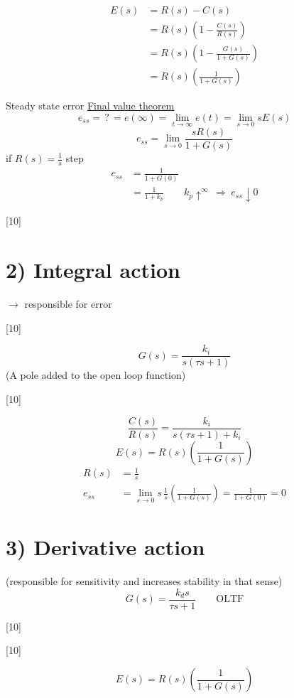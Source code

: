 \documentclass[11pt,a4paper]{article}
\begin{document}
\begin{align*}
E(s)&=R(s)-C(s)\\
&=R(s)\left(1-\frac{C(s)}{R(s)}\right)\\
&=R(s)\left(1-\frac{G(s)}{1+G(s)}\right)\\
&=R(s)\left(\frac{1}{1+G(s)}\right)
\end{align*}

Steady state error \hfill \underline{Final value theorem}
\[
e_{ss}=\,?\,=e(\infty)=\lim_{t\to\infty}e(t)=\lim_{s\to 0}sE(s)
\]
\[
e_{ss}=\lim_{s\to 0}\frac{sR(s)}{1+G(s)}
\]
if $R(s)=\frac{1}{s}$ step
\begin{align*}
e_{ss}&=\frac{1}{1+G(0)}\\
&=\frac{1}{1+k_p}\qquad k_p\uparrow^{\infty}\ \Rightarrow\ e_{ss}\downarrow 0
\end{align*}

[10]

\section{2) Integral action}
$\rightarrow$ responsible for error

[10]

\[
G(s)=\frac{k_i}{s(\tau s+1)}
\]
(A pole added to the open loop function)

[10]

\[
\frac{C(s)}{R(s)}=\frac{k_i}{s(\tau s+1)+k_i}
\]
\[
E(s)=R(s)\left(\frac{1}{1+G(s)}\right)
\]
\begin{align*}
R(s)&=\frac{1}{s}\\
e_{ss}&=\lim_{s\to 0}s\,\frac{1}{s}\left(\frac{1}{1+G(s)}\right)=\frac{1}{1+G(0)}=0
\end{align*}

\section{3) Derivative action}
(responsible for sensitivity and increases stability in that sense)
\[
G(s)=\frac{k_d s}{\tau s+1}\qquad\text{OLTF}
\]

[10]

[10]

\[
E(s)=R(s)\left(\frac{1}{1+G(s)}\right)
\]
\end{document}
